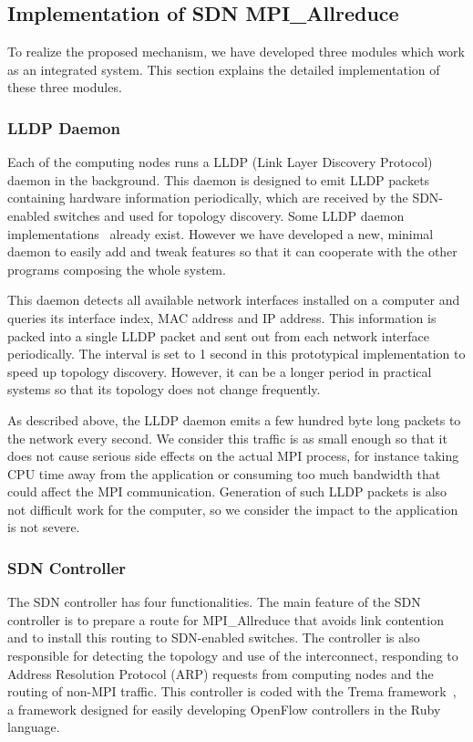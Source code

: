 \subsection{Implementation of SDN MPI\_Allreduce}

To realize the proposed mechanism, we have developed three modules which
work as an integrated system. This section explains the detailed
implementation of these three modules.

\subsubsection{LLDP Daemon}

Each of the computing nodes runs a LLDP (Link Layer Discovery
Protocol)~\autocite{lldp} daemon in the background. This daemon is designed to
emit LLDP packets containing hardware information periodically, which are
received by the SDN-enabled switches and used for topology discovery. Some
LLDP daemon implementations~\autocite{lldpd,openlldpd} already exist. However we
have developed a new, minimal daemon to easily add and tweak features so that
it can cooperate with the other programs composing the whole system.

This daemon detects all available network interfaces installed on a
computer and queries its interface index, MAC address and IP address.
This information is packed into a single LLDP packet and sent out from
each network interface periodically. The interval is set to 1 second in
this prototypical implementation to speed up topology discovery.
However, it can be a longer period in practical systems so that its
topology does not change frequently.

As described above, the LLDP daemon emits a few hundred byte long
packets to the network every second. We consider this traffic is as
small enough so that it does not cause serious side effects on the
actual MPI process, for instance taking CPU time away from the
application or consuming too much bandwidth that could affect the MPI
communication. Generation of such LLDP packets is also not difficult
work for the computer, so we consider the impact to the application is
not severe.

\subsubsection{SDN Controller}

The SDN controller has four functionalities. The main feature of the SDN
controller is to prepare a route for MPI\_Allreduce that avoids
link contention and to install this routing to SDN-enabled switches. The
controller is also responsible for detecting the topology and use of the
interconnect, responding to Address Resolution Protocol (ARP) requests
from computing nodes and the routing of non-MPI traffic. This controller
is coded with the Trema framework~\autocite{trema}, a framework designed for
easily developing OpenFlow controllers in the Ruby~\autocite{ruby} language.

